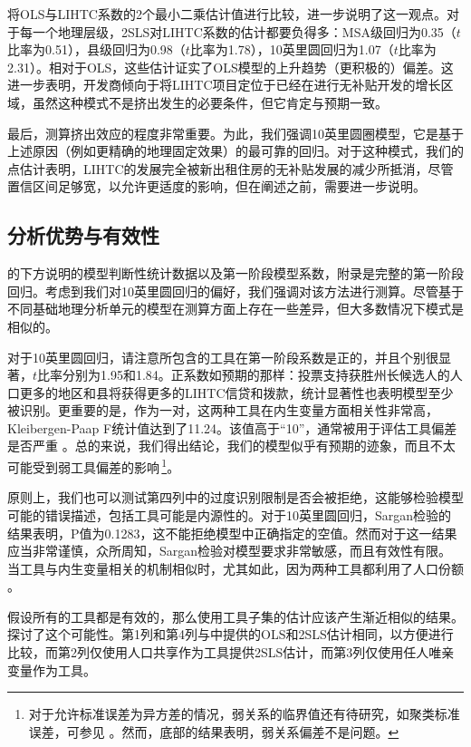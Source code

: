 \documentclass[lang=cn,11pt,a4paper]{paper}
\begin{document}
将OLS与LIHTC系数的2个最小二乘估计值进行比较，进一步说明了这一观点。对于每一个地理层级，2SLS对LIHTC系数的估计都要负得多：MSA级回归为0.35（$t$比率为0.51），县级回归为0.98（$t$比率为1.78），10英里圆回归为1.07（$t$比率为2.31）。相对于OLS，这些估计证实了OLS模型的上升趋势（更积极的）偏差。这进一步表明，开发商倾向于将LIHTC项目定位于已经在进行无补贴开发的增长区域，虽然这种模式不是挤出发生的必要条件，但它肯定与预期一致。

最后，测算挤出效应的程度非常重要。为此，我们强调10英里圆圈模型，它是基于上述原因（例如更精确的地理固定效果）的最可靠的回归。对于这种模式，我们的点估计表明，LIHTC的发展完全被新出租住房的无补贴发展的减少所抵消，尽管置信区间足够宽，以允许更适度的影响，但在阐述之前，需要进一步说明。

\subsection{分析优势与有效性}

的下方说明的模型判断性统计数据以及第一阶段模型系数，附录是完整的第一阶段回归。考虑到我们对10英里圆回归的偏好，我们强调对该方法进行测算。尽管基于不同基础地理分析单元的模型在测算方面上存在一些差异，但大多数情况下模式是相似的。

对于10英里圆回归，请注意所包含的工具在第一阶段系数是正的，并且个别很显著，$t$比率分别为1.95和1.84。正系数如预期的那样：投票支持获胜州长候选人的人口更多的地区和县将获得更多的LIHTC信贷和拨款，统计显著性也表明模型至少被识别。更重要的是，作为一对，这两种工具在内生变量方面相关性非常高，Kleibergen-Paap F统计值达到了11.24。该值高于“10”，通常被用于评估工具偏差是否严重 \citep{Stock200580}。总的来说，我们得出结论，我们的模型似乎有预期的迹象，而且不太可能受到弱工具偏差的影响\,\footnote{对于允许标准误差为异方差的情况，弱关系的临界值还有待研究，如聚类标准误差，可参见 \cite{Stock200580}。然而，底部的结果表明，弱关系偏差不是问题。}。

原则上，我们也可以测试第四列中的过度识别限制是否会被拒绝，这能够检验模型可能的错误描述，包括工具可能是内源性的。对于10英里圆回归，Sargan检验的结果表明，P值为0.1283，这不能拒绝模型中正确指定的空值。然而对于这一结果应当非常谨慎，众所周知，Sargan检验对模型要求非常敏感，而且有效性有限。当工具与内生变量相关的机制相似时，尤其如此，因为两种工具都利用了人口份额 \citep{Cameron2006,Murray2006111}。

假设所有的工具都是有效的，那么使用工具子集的估计应该产生渐近相似的结果。探讨了这个可能性。第1列和第4列与中提供的OLS和2SLS估计相同，以方便进行比较，而第2列仅使用人口共享作为工具提供2SLS估计，而第3列仅使用任人唯亲变量作为工具。
\end{document}
